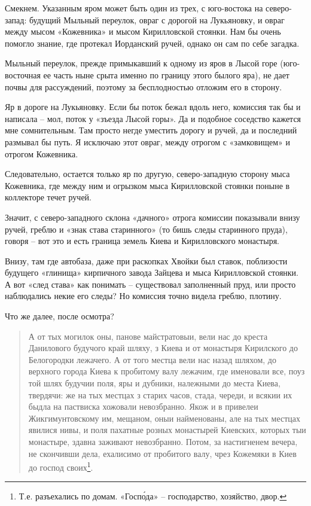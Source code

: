 Смекнем. Указанным яром может быть один из трех, с юго-востока на северо-запад: будущий Мыльный переулок, овраг с дорогой на Лукьяновку, и овраг между мысом «Кожевника» и мысом Кирилловской стоянки. Нам бы очень помогло знание, где протекал Иорданский ручей, однако он сам по себе загадка.

Мыльный переулок, прежде примыкавший к одному из яров в Лысой горе (юго-восточная ее часть ныне срыта именно по границу этого былого яра), не дает почвы для рассуждений, поэтому за бесплодностью отложим его в сторону. 

Яр в дороге на Лукьяновку. Если бы поток бежал вдоль него, комиссия так бы и написала – мол, поток у «зъезда Лысой горы». Да и подобное соседство кажется мне сомнительным. Там просто негде уместить дорогу и ручей, да и последний размывал бы путь. Я исключаю этот овраг, между отрогом с «замковищем» и отрогом Кожевника.  

Следовательно, остается только яр по другую, северо-западную сторону мыса Кожевника, где между ним и огрызком мыса Кирилловской стоянки поныне в коллекторе течет ручей.

Значит, с северо-западного склона «дачного» отрога комиссии показывали внизу ручей, греблю и «знак става старинного» (то бишь следы старинного пруда), говоря – вот это и есть граница земель Киева и Кирилловского монастыря.

Внизу, там где автобаза, даже при раскопках Хвойки был ставок, поблизости будущего «глинища» кирпичного завода Зайцева и мыса Кирилловской стоянки. А вот «след става» как понимать – существовал заполненный пруд, или просто наблюдались некие его следы? Но комиссия точно видела греблю, плотину.

Что же далее, после осмотра?

\begin{quotation}
А от тых могилок оны, панове майстратовыи, вели нас до креста Данилового будучого край шляху, з Киева и от монастыря Кирилского до Белогородки лежачего. А от того местца вели нас назад шляхом, до верхного города Киева к пробитому валу лежачим, где именовали все, поуз той шлях будучии поля, яры и дубники, належными до места Киева, твердячи: же на тых местцах з старих часов, стада, череди, и всякии их быдла на паствиска хожовали невозбранно. Якож и в привелеи Жикгимунтовскому им, мещаном, оныи найменованы, але на тых местцах явилися нивы, и поля пахатные розных монастырей Киевских, которых тыи монастыре, здавна заживают невозбранно. Потом, за настигненем вечера, не скончивши дела, ехалисимо от пробитого валу, чрез Кожемяки в Киев до господ своих\footnote{Т.е. разъехались по домам. «Госп\'ода» – господарство, хозяйство, двор.}.
\end{quotation}

